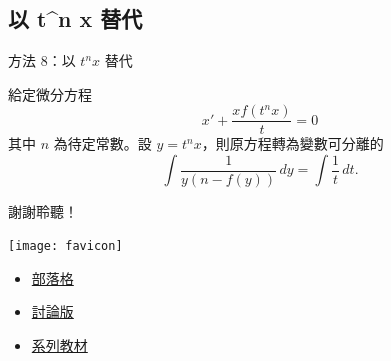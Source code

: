 \documentclass{beamer}
\theoremstyle{remark}
\begin{document}
\begin{CJK}{UTF8}{bsmi}
\subsection[以 $t^n x$ 替代]{以 t\textasciicircum n x 替代}
\begin{frame}{方法 8：以 $t^n x$ 替代}
  \begin{theorem}
    給定微分方程
    \[x' + \frac{x f(t^n x)}{t} = 0\]
    其中 $n$ 為待定常數。設 $y = t^n x$，則原方程轉為變數可分離的
    \[\int \frac{1}{y \left( n - f(y) \right)}\,dy = \int \frac1t\,dt.\]
  \end{theorem}
\end{frame}

\begin{frame}{謝謝聆聽！}
  \begin{center}
    \texttt{[image: favicon]}
  \end{center}
  \begin{itemize}
    \item \href{http://jdh8.org/}{部落格}
    \item \href{http://boards.jdh8.org/cal/}{討論版}
    \item \href{https://github.com/jdh8/calculus-2012}{系列教材}
  \end{itemize}
\end{frame}
\end{CJK}
\end{document}
